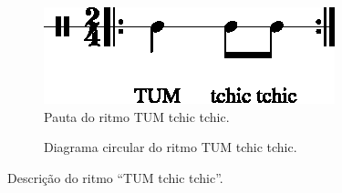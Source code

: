 \begin{figure}[H]
\centering
     \begin{subfigure}[c]{0.45\textwidth}
         \centering
         \includegraphics[width=\textwidth]{chapters/cap-musicalidade-percepcion/treino-ritmo2-1.eps}
         \caption{Pauta do ritmo TUM tchic tchic.}
         \label{fig:RitmoTUMtchictchic1}
     \end{subfigure}
     \hfill
     \begin{subfigure}[c]{0.45\textwidth}
         \centering
{}
         \caption{Diagrama circular do ritmo TUM tchic tchic.}
         \label{fig:RitmoTUMtchictchic2}
     \end{subfigure}
\caption{Descrição do ritmo ``TUM tchic tchic''.}
\label{fig:abc-percepcionritmica2}
\end{figure}

